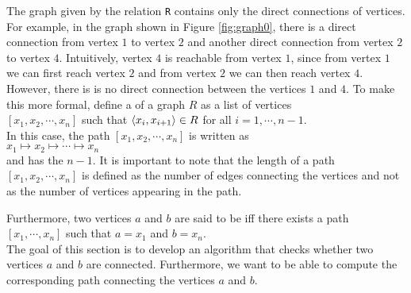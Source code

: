 \noindent
The graph given by the relation \texttt{R} contains only the direct connections of vertices.  For example, in
the graph shown in Figure \ref{fig:graph0}, there is a direct connection from vertex $1$ to vertex $2$ and
another direct connection from vertex $2$ to vertex $4$.  Intuitively, vertex $4$ is reachable from vertex $1$,
since from vertex $1$ we can first reach vertex $2$ and from vertex $2$ we can then reach vertex $4$.  However,
there is is no direct connection between the vertices $1$ and $4$.  To make this more formal, define
a  of a graph $R$ as a list of vertices
\\[0.2cm]
\hspace*{1.3cm}
$[x_1, x_2, \cdots, x_n]$ \quad such that \quad $\pair(x_i,x_{i+1}) \in R$ \quad for all $i=1,\cdots,n-1$.
\\[0.2cm]
In this case, the path $[x_1, x_2, \cdots, x_n]$ is written as
\\[0.2cm]
\hspace*{1.3cm}
$x_1 \mapsto x_2 \mapsto \cdots \mapsto x_n$
\\[0.2cm]
and has the  $n-1$.  It is important to note that the length of a path
$[x_1,x_2,\cdots,x_n]$ is defined as the number of edges connecting the vertices and not as the
number of vertices appearing in the path.

Furthermore,  two vertices $a$ and $b$ are said to be  iff there exists a path
\\[0.2cm]
\hspace*{1.3cm}
$[x_1,\cdots,x_n]$ \quad such that \quad $a = x_1$ \quad and \quad $b = x_n$.
\\[0.2cm]
The goal of this section is to develop an algorithm that checks whether two vertices $a$ and $b$ are connected.
Furthermore, we want to be able to compute the corresponding path connecting the vertices $a$ and $b$.



